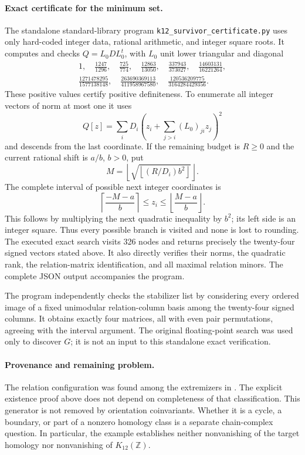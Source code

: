 \paragraph{Exact certificate for the minimum set.}
The standalone standard-library program
\texttt{k12\_survivor\_certificate.py} uses only hard-coded integer
data, rational arithmetic, and integer square roots. It computes and
checks $Q=L_0D L_0^t$, with $L_0$ unit lower triangular and diagonal
\[
\begin{gathered}
1,\quad \frac{1247}{1296},\quad \frac{725}{774},\quad
\frac{12863}{13050},\quad \frac{337943}{373027},\quad
\frac{14603131}{16221264},\\
\frac{1271478295}{1577138148},\quad
\frac{263690369113}{411958967580},\quad
\frac{120536209775}{3164284429356}.
\end{gathered}
\]
These positive values certify positive definiteness. To enumerate
all integer vectors of norm at most one it uses
\[
 Q[z]=\sum_i D_i\left(z_i+\sum_{j>i}(L_0)_{ji}z_j\right)^2
\]
and descends from the last coordinate. If the remaining budget is
$R\geq0$ and the current rational shift is $a/b$, $b>0$, put
\[
 M=\left\lfloor\sqrt{\left\lfloor(R/D_i)b^2\right\rfloor}\right\rfloor.
\]
The complete interval of possible next integer coordinates is
\[
 \left\lceil\frac{-M-a}{b}\right\rceil
 \leq z_i\leq
 \left\lfloor\frac{M-a}{b}\right\rfloor.
\]
This follows by multiplying the next quadratic inequality by $b^2$;
its left side is an integer square. Thus every possible branch is
visited and none is lost to rounding. The executed exact search
visits 326 nodes and returns precisely the twenty-four signed
vectors stated above. It also directly verifies their norms, the
quadratic rank, the relation-matrix identification, and all maximal
relation minors. The complete JSON output accompanies the program.

The program independently checks the stabilizer list by considering
every ordered image of a fixed unimodular relation-column basis among
the twenty-four signed columns. It obtains exactly four matrices,
all with even pair permutations, agreeing with the interval argument.
The original floating-point search was used only to discover $G$;
it is not an input to this standalone exact verification.

\paragraph{Provenance and remaining problem.}
The relation configuration was found among the extremizers in
\cite[\S5.2 and Tables~1,3, p.~85]{AverkovSchymura2024}. The explicit
existence proof above does not depend on completeness of that
classification. This generator is not removed by orientation
coinvariants. Whether it is a cycle, a boundary, or part of a nonzero
homology class is a separate chain-complex question. In particular,
the example establishes neither nonvanishing of the target homology
nor nonvanishing of $K_{12}(\mathbb Z)$.
